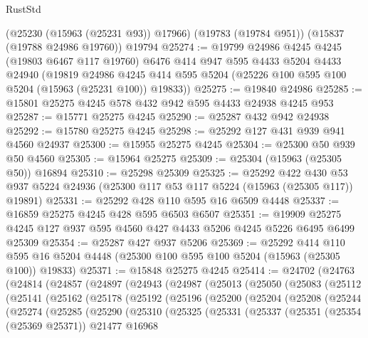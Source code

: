 \begin{lexlean}{RustStd}
\begin{coremodule}
    (@25230 (@15963 (@25231 @93)) @17966)
    (@19783 (@19784 @951))
    (@15837 (@19788 @24986 @19760))
    @19794
@25274 := @19799
    @24986
    @4245
    @4245
    (@19803 @6467 @117 @19760)
    @6476
    @414
    @947
    @595
    @4433
    @5204
    @4433
    @24940
    (@19819
      @24986
      @4245
      @414
      @595
      @5204
      (@25226 @100 @595 @100 @5204 (@15963 (@25231 @100)) @19833))
@25275 := @19840 @24986
@25285 := @15801 @25275 @4245 @578 @432 @942 @595 @4433 @24938 @4245 @953
@25287 := @15771 @25275 @4245
@25290 := @25287 @432 @942 @24938
@25292 := @15780 @25275 @4245
@25298 := @25292 @127 @431 @939 @941 @4560 @24937
@25300 := @15955 @25275 @4245
@25304 := @25300 @50 @939 @50 @4560
@25305 := @15964 @25275
@25309 := @25304 (@15963 (@25305 @50)) @16894
@25310 := @25298 @25309
@25325 := @25292
    @422
    @430
    @53
    @937
    @5224
    @24936
    (@25300 @117 @53 @117 @5224 (@15963 (@25305 @117)) @19891)
@25331 := @25292 @428 @110 @595 @16 @6509 @4448
@25337 := @16859 @25275 @4245 @428 @595 @6503 @6507
@25351 := @19909 @25275 @4245 @127 @937 @595 @4560 @427 @4433 @5206 @4245 @5226 @6495 @6499 @25309
@25354 := @25287 @427 @937 @5206
@25369 := @25292
    @414
    @110
    @595
    @16
    @5204
    @4448
    (@25300 @100 @595 @100 @5204 (@15963 (@25305 @100)) @19833)
@25371 := @15848 @25275 @4245
@25414 := @24702
    (@24763
      (@24814
        (@24857
          (@24897
            (@24943
              (@24987
                (@25013
                  (@25050
                    (@25083
                      (@25112
                        (@25141
                          (@25162
                            (@25178
                              (@25192
                                (@25196
                                  (@25200
                                    (@25204
                                      (@25208
                                        (@25244
                                          (@25274
                                            (@25285
                                              (@25290
                                                (@25310
                                                  (@25325
                                                    (@25331
                                                      (@25337
                                                        (@25351
                                                          (@25354 (@25369 @25371))
                                                          @21477
                                                          @16968

\end{coremodule}
\end{lexlean}
